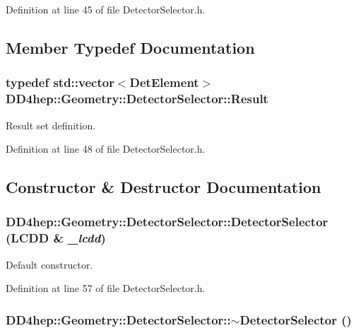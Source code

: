 Definition at line 45 of file DetectorSelector.h.

\subsection{Member Typedef Documentation}
\hypertarget{class_d_d4hep_1_1_geometry_1_1_detector_selector_a6ce0dfe8c83f5d36138244218f260ed1}{
\subsubsection[{Result}]{\setlength{\rightskip}{0pt plus 5cm}typedef std::vector$<${\bf DetElement}$>$ {\bf DD4hep::Geometry::DetectorSelector::Result}}}
\label{class_d_d4hep_1_1_geometry_1_1_detector_selector_a6ce0dfe8c83f5d36138244218f260ed1}


Result set definition. 

Definition at line 48 of file DetectorSelector.h.

\subsection{Constructor \& Destructor Documentation}
\hypertarget{class_d_d4hep_1_1_geometry_1_1_detector_selector_a683570559af13a80725cf14d8c3cd4b6}{
\subsubsection[{DetectorSelector}]{\setlength{\rightskip}{0pt plus 5cm}DD4hep::Geometry::DetectorSelector::DetectorSelector ({\bf LCDD} \& {\em \_\-lcdd})}}
\label{class_d_d4hep_1_1_geometry_1_1_detector_selector_a683570559af13a80725cf14d8c3cd4b6}


Default constructor. 

Definition at line 57 of file DetectorSelector.h.\hypertarget{class_d_d4hep_1_1_geometry_1_1_detector_selector_a20dcfab3e2fb33672b347aa4fdcea393}{
\subsubsection[{$\sim$DetectorSelector}]{\setlength{\rightskip}{0pt plus 5cm}DD4hep::Geometry::DetectorSelector::$\sim$DetectorSelector ()}}
\label{class_d_d4hep_1_1_geometry_1_1_detector_selector_a20dcfab3e2fb33672b347aa4fdcea393}


